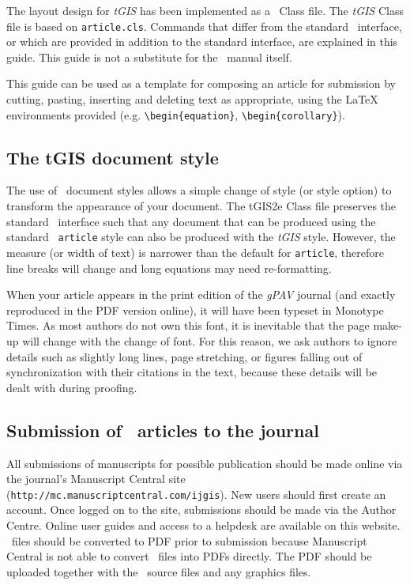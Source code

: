 \documentclass[]{tGIS2e}
\begin{document}
The layout design for {\it tGIS} has been implemented as a \LaTeXe\ Class file. The {\it tGIS} Class file is
based on {\tt article.cls}. Commands that differ from the standard \LaTeXe\ interface, or which are provided in
addition to the standard interface, are explained in this guide. This guide is not a substitute for the \LaTeXe\
manual itself.

This guide can be used as a template for composing an article for submission by cutting, pasting, inserting and
deleting text as appropriate, using the LaTeX environments provided (e.g. \verb"\begin{equation}",
\verb"\begin{corollary}").\vspace{6pt}

\subsection{The {\bi tGIS} document style}

The use of \LaTeXe\ document styles allows a simple change of style (or style option) to transform the appearance
of your document. The tGIS2e Class file preserves the standard \LaTeXe\ interface such that any document that can
be produced using the standard \LaTeXe\ {\tt article} style can also be produced with the {\it tGIS} style.
However, the measure (or width of text) is narrower than the default for {\tt article}, therefore line breaks
will change and long equations may need re-formatting.

When your article appears in the print edition of the {\it gPAV} journal (and exactly reproduced in the PDF
version online), it will have been typeset in Monotype Times. As most authors do not own this font, it is inevitable that the page make-up will change with the change of font. For this reason, we ask authors to ignore details such as slightly long lines, page stretching, or figures falling out of synchronization with their citations in the text, because these details will be dealt with during proofing.

\subsection{Submission of \LaTeXe\ articles to the journal}\label{S1.2}

All submissions of manuscripts for possible publication should be made online via the journal's Manuscript Central site ({\tt{http://mc.manuscriptcentral.com/ijgis}}). New users should first create an account. Once logged on to the site, submissions should be made via the Author Centre. Online user guides and access to a helpdesk are available on this website. \LaTeXe\ files should be converted to PDF prior to submission because Manuscript Central is not able to convert \LaTeXe\ files into PDFs directly. The PDF should be uploaded together with the \LaTeXe\ source files and any graphics files.
\end{document}
